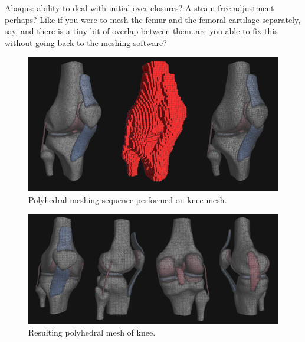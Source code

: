 Abaqus: ability to deal with initial over-closures? A strain-free adjustment perhaps? Like if you were to mesh the femur and the femoral cartilage separately, say, and there is a tiny bit of overlap between them..are you able to fix this without going back to the meshing software?  

\begin{figure}[tbh]
\centering
\includegraphics{media/sequence.png}
\caption[sequence]{Polyhedral meshing sequence performed on knee mesh.}
\label{fig.sequence}
\end{figure}

\begin{figure}[tbh]
\centering
\includegraphics[scale=0.82]{media/fullmesh.png}
\caption[polyhedral knee]{Resulting polyhedral mesh of knee.}
\label{fig.sample_1}
\end{figure}